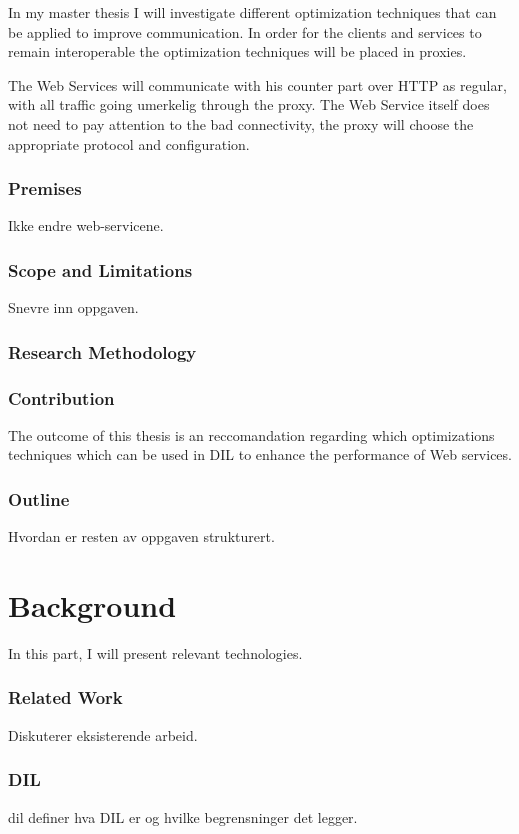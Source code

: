 \documentclass[USenglish]{article}
\begin{document}
In my master thesis I will investigate different optimization techniques that
can be applied to improve communication. In order for the clients and services
 to remain interoperable the optimization techniques will be placed in proxies.

The Web Services will communicate with his counter part over HTTP as regular,
with all traffic going umerkelig through the proxy. The Web Service itself does
not need to pay attention to the bad connectivity, the proxy will choose the
appropriate protocol and configuration.

\section{Premises}
Ikke endre web-servicene.

\section{Scope and Limitations}
Snevre inn oppgaven.

\section{Research Methodology}

\section{Contribution}
The outcome of this thesis is an reccomandation regarding which optimizations techniques which can be used in DIL to enhance the performance of Web services.

\section{Outline}
Hvordan er resten av oppgaven strukturert.


\part{Background}
In this part, I will present relevant technologies.
\section{Related Work}
Diskuterer eksisterende arbeid.
\section{DIL}
\gls{dil} definer hva DIL er og hvilke begrensninger det legger.
\end{document}
